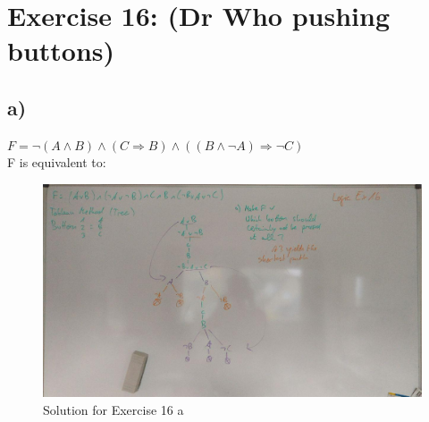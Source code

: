 \documentclass[12pt]{article}
\begin{document}
\section*{Exercise 16: (Dr Who pushing buttons)}

\subsection*{a)}

$F = \lnot (A \land B) \land (C \Rightarrow B) \land ((B \land \lnot A) \Rightarrow \lnot C)$\\ 
F is equivalent to:

\begin{figure}[ht]
	\includegraphics[scale=0.5]{../pics/ex16.jpg}
	\caption{Solution for Exercise 16 a}
\end{figure}

\end{document}
